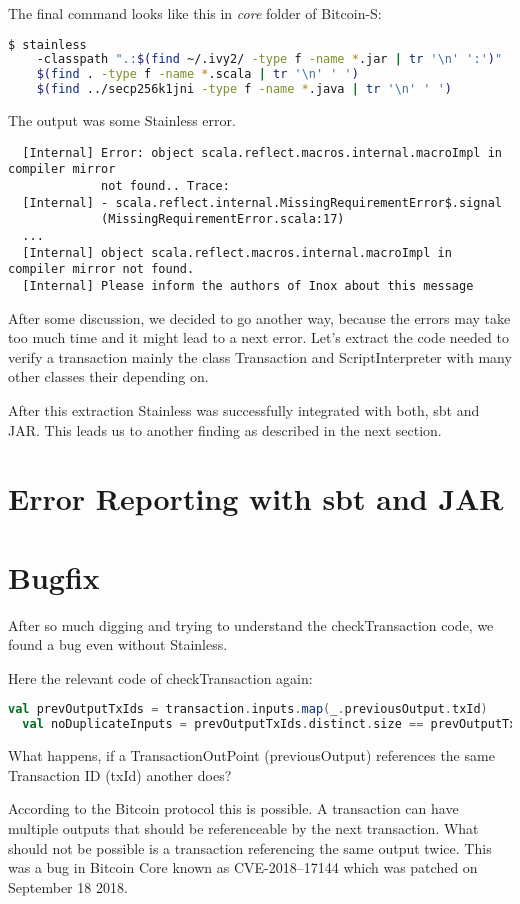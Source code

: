 The final command looks like this in \emph{core} folder of Bitcoin-S:
\begin{lstlisting}[language=bash]
  $ stainless
    -classpath ".:$(find ~/.ivy2/ -type f -name *.jar | tr '\n' ':')"
    $(find . -type f -name *.scala | tr '\n' ' ')
    $(find ../secp256k1jni -type f -name *.java | tr '\n' ' ')
\end{lstlisting}
The output was some Stainless error.
\begin{lstlisting}
  [Internal] Error: object scala.reflect.macros.internal.macroImpl in compiler mirror
             not found.. Trace:
  [Internal] - scala.reflect.internal.MissingRequirementError$.signal
             (MissingRequirementError.scala:17)
  ...
  [Internal] object scala.reflect.macros.internal.macroImpl in compiler mirror not found.
  [Internal] Please inform the authors of Inox about this message
\end{lstlisting}
After some discussion, we decided to go another way, because the errors may take too much time and it might lead to a next error.
Let's extract the code needed to verify a transaction mainly the class Transaction and ScriptInterpreter with many other classes their depending on.

After this extraction Stainless was successfully integrated with both, sbt and JAR.
This leads us to another finding as described in the next section.

\section{Error Reporting with sbt and JAR}


\section{Bugfix}
After so much digging and trying to understand the checkTransaction code, we found a bug even without Stainless.

Here the relevant code of checkTransaction again:
\begin{lstlisting}[language=scala]
  val prevOutputTxIds = transaction.inputs.map(_.previousOutput.txId)
  val noDuplicateInputs = prevOutputTxIds.distinct.size == prevOutputTxIds.size
\end{lstlisting}
What happens, if a TransactionOutPoint (previousOutput) references the same Transaction ID (txId) another does?

According to the Bitcoin protocol this is possible.
A transaction can have multiple outputs that should be referenceable by the next transaction.
What should not be possible is a transaction referencing the same output twice.
This was a bug in Bitcoin Core known as CVE-2018–17144 which was patched on September 18 2018.

